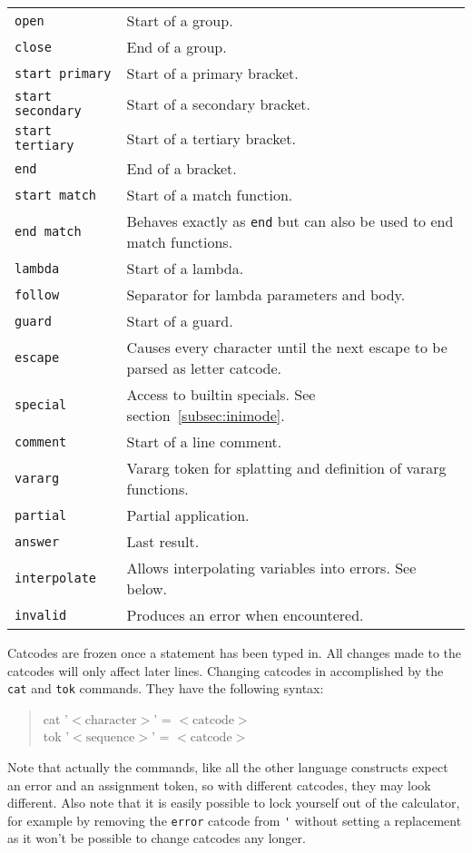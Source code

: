 \documentclass[10pt]{article}
\newcommand{\argument}[1]{{${\big<}\mathrm{#1}{\big>}$}}
\newenvironment{code}{\begin{quote}\ttfamily}{\end{quote}}
\begin{document}
\begin{longtable}{p{}p{}}
        \verb|open|            & Start of a group. \\
        \verb|close|           & End of a group. \\
        \verb|start primary|   & Start of a primary bracket. \\
        \verb|start secondary| & Start of a secondary bracket. \\
        \verb|start tertiary|  & Start of a tertiary bracket. \\
        \verb|end|             & End of a bracket. \\
        \verb|start match|     & Start of a match function. \\
        \verb|end match|       & Behaves exactly as \verb|end| but can also be used to end match functions. \\
        \verb|lambda|          & Start of a lambda. \\
        \verb|follow|          & Separator for lambda parameters and body. \\
        \verb|guard |          & Start of a guard. \\
        \verb|escape|          & Causes every character until the next escape to be parsed as letter catcode. \\
        \verb|special|         & Access to builtin specials. See section~\ref{subsec:inimode}. \\
        \verb|comment|         & Start of a line comment. \\
        \verb|vararg|          & Vararg token for splatting and definition of vararg functions. \\
        \verb|partial|         & Partial application. \\
        \verb|answer|          & Last result. \\
        \verb|interpolate|     & Allows interpolating variables into errors. See below. \\
        \verb|invalid|         & Produces an error when encountered. \\
    \end{longtable}
    Catcodes are frozen once a statement has been typed in.
    All changes made to the catcodes will only affect later lines.
    Changing catcodes in accomplished by the \verb|cat| and \verb|tok| commands.
    They have the following syntax:
    \begin{code}
        cat '\argument{character}' = \argument{catcode} \\
        tok '\argument{sequence}' = \argument{catcode}
    \end{code}
    Note that actually the commands, like all the other language constructs expect an error and an assignment token, so with different catcodes, they may look different.
    Also note that it is easily possible to lock yourself out of the calculator, for example by removing the \verb|error| catcode from \verb|'| without setting a replacement as it won't be possible to change catcodes any longer.
    
\end{document}
